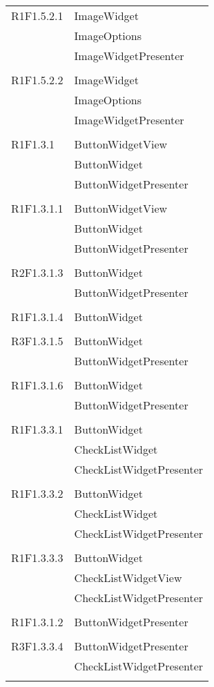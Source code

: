 \begin{center}
\begin{longtable}{|p{7cm}|p{7cm}|}
		R1F1.5.2.1 & ImageWidget \\ & ImageOptions \\ & ImageWidgetPresenter \\ & \\ \hline
		R1F1.5.2.2 & ImageWidget \\ & ImageOptions \\ & ImageWidgetPresenter \\ & \\ \hline
		R1F1.3.1 & ButtonWidgetView \\ & ButtonWidget \\ & ButtonWidgetPresenter \\ & \\ \hline
		R1F1.3.1.1 & ButtonWidgetView \\ & ButtonWidget \\ & ButtonWidgetPresenter \\ & \\ \hline
		R2F1.3.1.3 & ButtonWidget \\ & ButtonWidgetPresenter \\ & \\ \hline
		R1F1.3.1.4 & ButtonWidget \\ & \\ \hline
		R3F1.3.1.5 & ButtonWidget \\ & ButtonWidgetPresenter \\ & \\ \hline
		R1F1.3.1.6 & ButtonWidget \\ & ButtonWidgetPresenter \\ & \\ \hline
		R1F1.3.3.1 & ButtonWidget \\ & CheckListWidget \\ & CheckListWidgetPresenter \\ & \\ \hline
		R1F1.3.3.2 & ButtonWidget \\ & CheckListWidget \\ & CheckListWidgetPresenter \\ & \\ \hline
		R1F1.3.3.3 & ButtonWidget \\ & CheckListWidgetView \\ & CheckListWidgetPresenter \\ & \\ \hline
		R1F1.3.1.2 & ButtonWidgetPresenter \\ & \\ \hline
		R3F1.3.3.4 & ButtonWidgetPresenter \\ & CheckListWidgetPresenter \\ & \\ \hline

\end{longtable}
\end{center}
